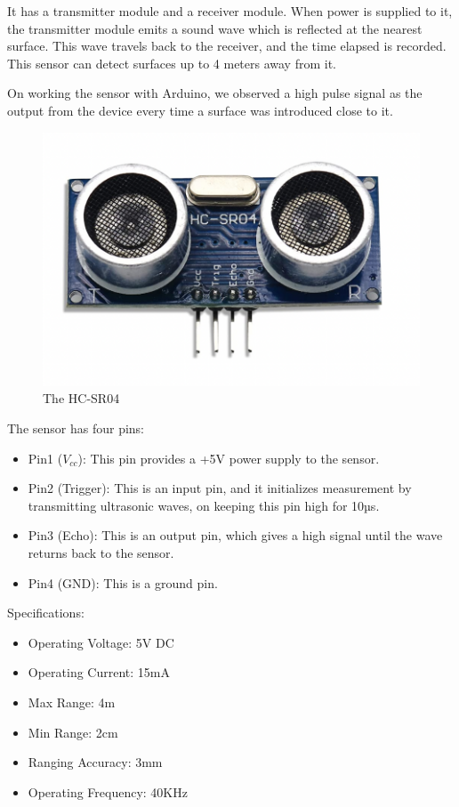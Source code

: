 \documentclass[12pt]{article}
\begin{document}
It has a transmitter module and a receiver module. When power is supplied to it, the transmitter module emits a sound wave which is reflected at the nearest surface. This wave travels back to the receiver, and the time elapsed is recorded. This sensor can detect surfaces up to 4 meters away from it. 

On working the sensor with Arduino, we observed a high pulse signal as the output from the device every time a surface was introduced close to it.

\begin{figure}[h!]
    \centering
    \includegraphics[scale=0.4]{hcsr04.png}
    \caption{The HC-SR04}
    \label{fig:my_label}
\end{figure}
The sensor has four pins:\begin{itemize}

    \item Pin1 ($V_{cc}$): This pin provides a +5V power supply to the sensor.
    \item Pin2 (Trigger): This is an input pin, and it initializes measurement by transmitting ultrasonic waves, on keeping this pin high for 10µs.
    \item Pin3 (Echo): This is an output pin, which gives a high signal until the wave returns back to the sensor.
    \item Pin4 (GND): This is a ground pin.
\end{itemize}

Specifications:
\begin{itemize}

    \item Operating Voltage:  5V DC
    \item Operating Current:  15mA
    \item Max Range:	4m
    \item Min Range:	2cm
    \item Ranging Accuracy:	3mm
     \item Operating Frequency:	40KHz
\end{itemize}
\end{document}

